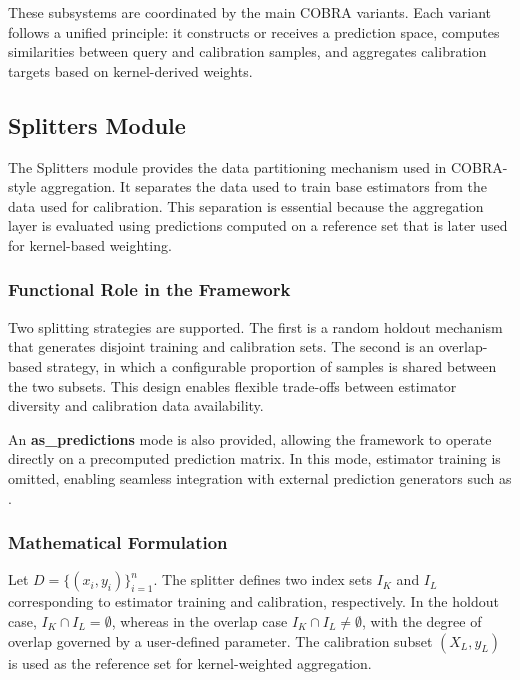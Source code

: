 These subsystems are coordinated by the main COBRA variants. Each variant follows a unified principle: it constructs or receives a prediction space, computes similarities between query and calibration samples, and aggregates calibration targets based on kernel-derived weights.

\subsection{Splitters Module}
\label{subsec:splitters_module}

\hs The Splitters module provides the data partitioning mechanism used in COBRA-style aggregation. It separates the data used to train base estimators from the data used for calibration. This separation is essential because the aggregation layer is evaluated using predictions computed on a reference set that is later used for kernel-based weighting.

\subsubsection*{Functional Role in the Framework}

Two splitting strategies are supported. The first is a random holdout mechanism that generates disjoint training and calibration sets. The second is an overlap-based strategy, in which a configurable proportion of samples is shared between the two subsets. This design enables flexible trade-offs between estimator diversity and calibration data availability.

An \textbf{as\_predictions} mode is also provided, allowing the framework to operate directly on a precomputed prediction matrix. In this mode, estimator training is omitted, enabling seamless integration with external prediction generators such as \KFCProcedure{}.

\subsubsection*{Mathematical Formulation}

Let $D = \{(x_i, y_i)\}_{i=1}^{n}$. The splitter defines two index sets $I_K$ and $I_L$ corresponding to estimator training and calibration, respectively. In the holdout case, $I_K \cap I_L = \emptyset$, whereas in the overlap case $I_K \cap I_L \neq \emptyset$, with the degree of overlap governed by a user-defined parameter. The calibration subset $(X_L, y_L)$ is used as the reference set for kernel-weighted aggregation.

